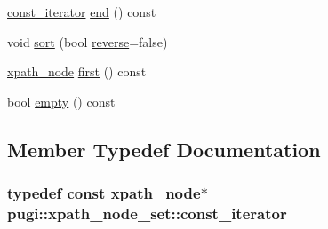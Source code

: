 \begin{DoxyCompactItemize}
\item 
\hyperlink{classpugi_1_1xpath__node__set_a6987510e88cea4a396d186285c174de6}{const\-\_\-iterator} \hyperlink{classpugi_1_1xpath__node__set_a8dea1d6fc28789d909936805ed1afcd8}{end} () const 
\item 
void \hyperlink{classpugi_1_1xpath__node__set_a7f264ad9a2736e9dc2d6a2de25cb67d1}{sort} (bool \hyperlink{pugixml_8cpp_a7a6eedef949e55be650bd6d2df60d68d}{reverse}=false)
\item 
\hyperlink{classpugi_1_1xpath__node}{xpath\-\_\-node} \hyperlink{classpugi_1_1xpath__node__set_a89c35cc7c823b842b8afeccc796aa6f9}{first} () const 
\item 
bool \hyperlink{classpugi_1_1xpath__node__set_a854e0b24839e8fdaa6b14bbd66e7ce98}{empty} () const 
\end{DoxyCompactItemize}


\subsection{Member Typedef Documentation}
\hypertarget{classpugi_1_1xpath__node__set_a6987510e88cea4a396d186285c174de6}{
\subsubsection[{const\-\_\-iterator}]{\setlength{\rightskip}{0pt plus 5cm}typedef const {\bf xpath\-\_\-node}$\ast$ {\bf pugi\-::xpath\-\_\-node\-\_\-set\-::const\-\_\-iterator}}}\label{classpugi_1_1xpath__node__set_a6987510e88cea4a396d186285c174de6}


